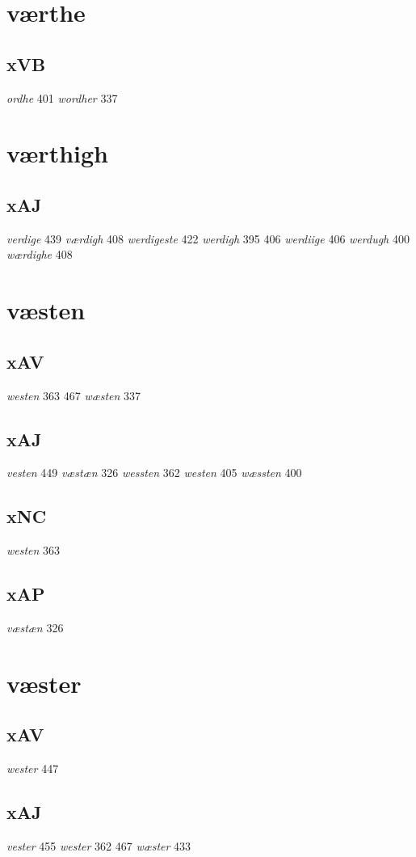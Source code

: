 \documentclass[a4paper,twocolumn]{article}
\begin{document}
\section{værthe}
\label{sec:org1e8ae18}
\subsection{xVB}
\label{sec:org8788b6f}
\emph{ordhe} 401 \emph{wordher} 337 
\section{værthigh}
\label{sec:org78e8163}
\subsection{xAJ}
\label{sec:org2343429}
\emph{verdige} 439 \emph{værdigh} 408 \emph{werdigeste} 422 \emph{werdigh} 395 406 \emph{werdiige} 406 \emph{werdugh} 400 \emph{wærdighe} 408 
\section{væsten}
\label{sec:org8814f10}
\subsection{xAV}
\label{sec:org8bd20fb}
\emph{westen} 363 467 \emph{wæsten} 337 
\subsection{xAJ}
\label{sec:orga7ba774}
\emph{vesten} 449 \emph{væstæn} 326 \emph{wessten} 362 \emph{westen} 405 \emph{wæssten} 400 
\subsection{xNC}
\label{sec:orgdd1a9f8}
\emph{westen} 363 
\subsection{xAP}
\label{sec:orgae81cbd}
\emph{væstæn} 326 
\section{væster}
\label{sec:orgc7e3f9d}
\subsection{xAV}
\label{sec:org13053ef}
\emph{wester} 447 
\subsection{xAJ}
\label{sec:org3d0a6d1}
\emph{vester} 455 \emph{wester} 362 467 \emph{wæster} 433 
\end{document}
